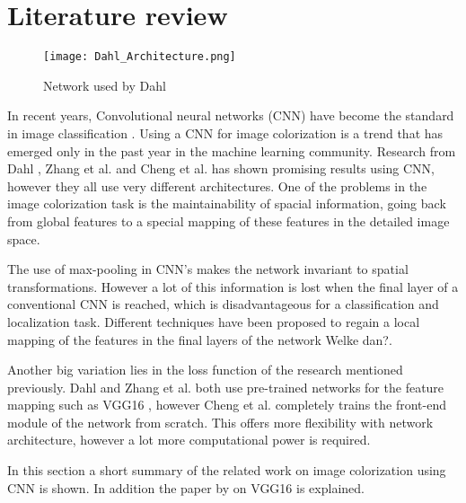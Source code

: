 \section{Literature review} \label{sec:litreview}

\begin{wrapfigure}{R}{0.4\textwidth}
	\vspace{-20pt}
	\begin{center}
		\texttt{[image: Dahl\_Architecture.png]}
	\end{center}
	\caption{Network used by Dahl \cite{Dahl}}
	\label{fig:dahlnetwork}
	\vspace{-20pt}
\end{wrapfigure}

In recent years, Convolutional neural networks (CNN) have become the standard in image
classification \cite{Krizhevsky}. Using a CNN for image colorization is a trend that has emerged only in the past year in the machine learning community. Research from Dahl \cite{Dahl}, Zhang et al. \cite{Zhang}
and Cheng et al. \cite{Cheng} has shown promising results using CNN, however they all use very different
architectures. One of the problems in the image colorization task is the maintainability of spacial information, going back from global features to a special mapping of these features in the detailed image space. 

The use of max-pooling in CNN's makes the network invariant to spatial transformations. However a lot of this information is lost when the final layer of a conventional CNN is reached, which is disadvantageous for a classification and localization task. Different techniques have been proposed to regain a local mapping of the features in the final layers of the network{\color{red} Welke dan?}. 

Another big variation lies in the loss function of the research mentioned previously. Dahl \cite{Dahl} and Zhang et al. \cite{Zhang} both use pre-trained networks for the feature mapping such as VGG16 \cite{Simonyan}, however Cheng et al. \cite{Cheng} completely trains the front-end module of the network from scratch. This offers more flexibility with network architecture, however a lot more computational power is required. 

In this section a short summary of the related work on image colorization using CNN is shown. In addition the paper by \cite{Simonyan} on VGG16 is explained.

